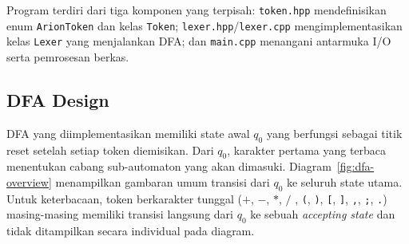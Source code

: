 \documentclass[11pt,a4paper]{article}
\begin{document}
Program terdiri dari tiga komponen yang terpisah:
\texttt{token.hpp} mendefinisikan enum \texttt{ArionToken} dan kelas \texttt{Token};
\texttt{lexer.hpp}/\texttt{lexer.cpp} mengimplementasikan kelas \texttt{Lexer} yang
menjalankan DFA; dan \texttt{main.cpp} menangani antarmuka I/O serta pemrosesan berkas.

\subsection{DFA Design}

DFA yang diimplementasikan memiliki state awal $q_0$ yang berfungsi sebagai titik
reset setelah setiap token diemisikan. Dari $q_0$, karakter pertama yang terbaca
menentukan cabang sub-automaton yang akan dimasuki.
Diagram~\ref{fig:dfa-overview} menampilkan gambaran umum transisi dari $q_0$ ke
seluruh state utama. Untuk keterbacaan, token berkarakter tunggal
($+$, $-$, $*$, $/$ , \texttt{(}, \texttt{)}, \texttt{[}, \texttt{]},
\texttt{,}, \texttt{;}, \texttt{.}) masing-masing memiliki transisi langsung dari
$q_0$ ke sebuah \textit{accepting state} dan tidak ditampilkan secara individual
pada diagram.
\end{document}
